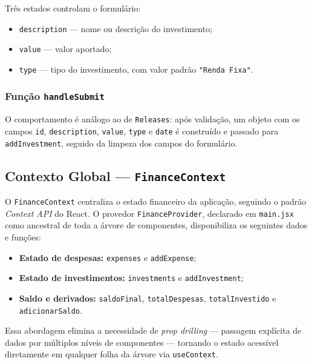\documentclass{article}
\begin{document}
Três estados controlam o formulário:

\begin{itemize}
  \item \texttt{description} — nome ou descrição do investimento;
  \item \texttt{value} — valor aportado;
  \item \texttt{type} — tipo do investimento, com valor padrão \texttt{"Renda Fixa"}.
\end{itemize}

\subsubsection*{Função \texttt{handleSubmit}}

O comportamento é análogo ao de \texttt{Releases}: após validação, um objeto com os campos \texttt{id}, \texttt{description}, \texttt{value}, \texttt{type} e \texttt{date} é construído e passado para \texttt{addInvestment}, seguido da limpeza dos campos do formulário.

\subsection{Contexto Global — \texttt{FinanceContext}}

O \texttt{FinanceContext} centraliza o estado financeiro da aplicação, seguindo o padrão \textit{Context API} do React. O provedor \texttt{FinanceProvider}, declarado em \texttt{main.jsx} como ancestral de toda a árvore de componentes, disponibiliza os seguintes dados e funções:

\begin{itemize}
  \item \textbf{Estado de despesas:} \texttt{expenses} e \texttt{addExpense};
  \item \textbf{Estado de investimentos:} \texttt{investments} e \texttt{addInvestment};
  \item \textbf{Saldo e derivados:} \texttt{saldoFinal}, \texttt{totalDespesas}, \texttt{totalInvestido} e \texttt{adicionarSaldo}.
\end{itemize}

Essa abordagem elimina a necessidade de \textit{prop drilling} — passagem explícita de dados por múltiplos níveis de componentes — tornando o estado acessível diretamente em qualquer folha da árvore via \texttt{useContext}.
\end{document}
